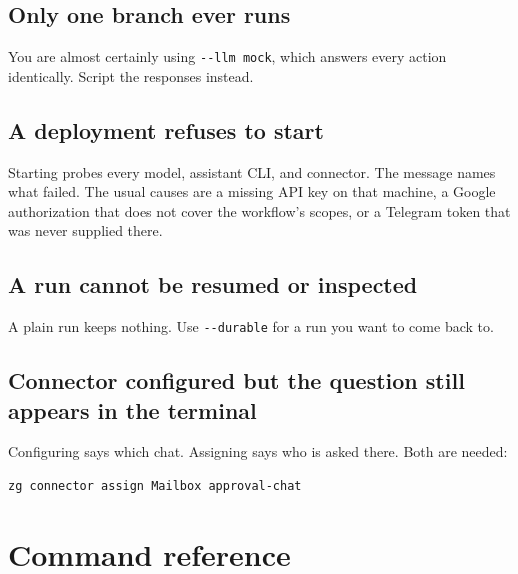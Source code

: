 \documentclass[11pt,a4paper]{article}
\begin{document}
\subsection{Only one branch ever runs}

You are almost certainly using \texttt{-{}-llm mock}, which answers every
action identically. Script the responses instead.

\subsection{A deployment refuses to start}

Starting probes every model, assistant CLI, and connector. The message names what failed. The
usual causes are a missing API key on that machine, a Google authorization that
does not cover the workflow's scopes, or a Telegram token that was never
supplied there.

\subsection{A run cannot be resumed or inspected}

A plain run keeps nothing. Use \texttt{-{}-durable} for a run you want to come
back to.

\subsection{Connector configured but the question still appears in the terminal}

Configuring says which chat. Assigning says who is asked there. Both are
needed:

\begin{lstlisting}[style=shell]
zg connector assign Mailbox approval-chat
\end{lstlisting}

\section{Command reference}
\end{document}
